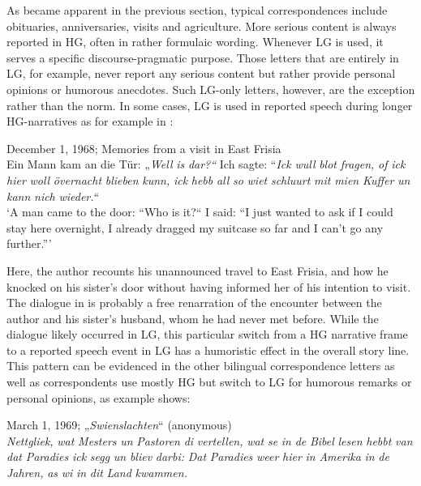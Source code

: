 \documentclass[output=paper]{langsci/langscibook}
\begin{document}
As became apparent in the previous section, typical correspondences include obituaries, anniversaries, visits and agriculture. More serious content is always reported in HG, often in rather formulaic wording. Whenever LG is used, it serves a specific discourse-pragmatic purpose. Those letters that are entirely in LG, for example, never report any serious content but rather provide personal opinions or humorous anecdotes. Such LG-only letters, however, are the exception rather than the norm. In some cases, LG is used in reported speech during longer HG-narratives as for example in : 
 

  
\ea
\label{ex:rocker:11}
December 1, 1968; Memories from a visit in East Frisia\\
 
Ein Mann kam an die Tür: „\textit{Well} \textit{is} \textit{dar?“} Ich sagte: “\textit{Ick} \textit{wull} \textit{blot} \textit{fragen,} \textit{of} \textit{ick} \textit{hier} \textit{woll}  \textit{övernacht} \textit{blieben} \textit{kunn,} \textit{ick} \textit{hebb} \textit{all} \textit{so} \textit{wiet} \textit{schluurt} \textit{mit} \textit{mien} \textit{Kuffer} \textit{un} \textit{kann} \textit{nich}  \textit{wieder.“}\\

‘A man came to the door: “Who is it?“ I said: “I just wanted to ask if I could stay here  overnight, I already dragged my suitcase so far and I can’t go any further.”’
\z

Here, the author recounts his unannounced travel to East Frisia, and how he knocked on his sister’s door without having informed her of his intention to visit. The dialogue in  is probably a free renarration of the encounter between the author and his sister’s husband, whom he had never met before. While the dialogue likely occurred in LG, this particular switch from a HG narrative frame to a reported speech event in LG has a humoristic effect in the overall story line. This pattern can be evidenced in the other bilingual correspondence letters as well as correspondents use mostly HG but switch to LG for humorous remarks or personal opinions, as example  shows:

  
\ea
\label{ex:rocker:12} 
March 1, 1969; „\textit{Swienslachten}“ (anonymous)\\
\textit{Nettgliek,} \textit{wat} \textit{Mesters} \textit{un} \textit{Pastoren} \textit{di} \textit{vertellen,} \textit{wat} \textit{se} \textit{in} \textit{de} \textit{Bibel} \textit{lesen} \textit{hebbt} \textit{van} \textit{dat}  \textit{Paradies} \textit{ick} \textit{segg} \textit{un} \textit{bliev} \textit{darbi:} \textit{Dat} \textit{Paradies} \textit{weer} \textit{hier} \textit{in} \textit{Amerika} \textit{in} \textit{de} \textit{Jahren,} \textit{as} \textit{wi}  \textit{in} \textit{dit} \textit{Land} \textit{kwammen.} \\
\end{document}
